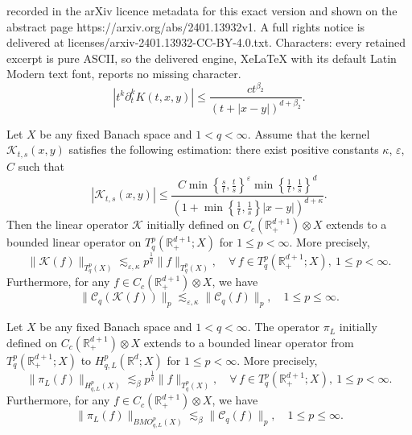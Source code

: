 \documentclass[10pt,a4paper]{amsart}
\newcommand\jdz[1]{ \left| #1 \right| }
\newcommand\lk[1]{ \left\{ #1 \right\} }
\newcommand\sk[1]{ \left( #1 \right) }
\newcommand{\K}{{\mathcal K}}
\newcommand{\e}{\varepsilon}
\newcommand{\real}{{\mathbb R}}
\begin{document}
recorded in the arXiv licence metadata for this exact version and shown on the abstract page https://arxiv.org/abs/2401.13932v1. A full rights notice is delivered at licenses/arxiv-2401.13932-CC-BY-4.0.txt. Characters: every retained excerpt is pure ASCII, so the delivered engine, XeLaTeX with its default Latin Modern text font, reports no missing character.
    \begin{equation}\label{derpt}
        \jdz{ t^k \partial^k_t K(t, x, y) } \leq \frac{c t^{\beta_2} }{(t + |x - y|)^{d + \beta_2}  }.
    \end{equation}

\begin{lemma}\label{BoundTent}
Let $X$ be any fixed Banach space and $1<q<\infty$. Assume that the kernel $\K_{t, s}(x, y)$ satisfies the following estimation: there exist positive constants $ \kappa $, $ \e$, $C$ such that 
\begin{equation}\label{esKts}
    |\K_{t, s}(x, y)| \leq \frac{ C\min\lk{\frac{s}{t},  \frac{t}{s}}^\e \min\lk{ \frac{1}{t}, \frac{1}{s} }^d }{\sk{ 1 + \min\lk{ \frac{1}{t}, \frac{1}{s} }|x - y| }^{d + \kappa}  }.
\end{equation}
    Then the linear operator $\K$ initially defined on $C_c(\real^{d+1}_+)\otimes X$ extends to a bounded linear operator on $T^p_q(\real^{d+1}_+; X)$ for $1 \leq p < \infty$. More precisely, 
    \[
        \| \K(f) \|_{T^p_q(X)} \lesssim_{\e, \kappa} p^{\frac{1}{q}} \| f \|_{T^p_q(X)}, \quad \forall\, f \in T^p_q(\real^{d+1}_+; X), \ 1 \leq p < \infty.
    \]
    Furthermore, for any $f \in C_c(\real^{d+1}_+)\otimes X$, we have
    \[
        \| \mathcal{C}_q\sk{\K(f)} \|_p \lesssim_{\e, \kappa} \| \mathcal{C}_{q}(f) \|_{p}, \quad 1 \leq p \leq \infty.
    \]
\end{lemma}

\begin{lemma}\label{l3.8}
Let $X$ be any fixed Banach space and $1<q<\infty$. The operator $\pi_L$ initially defined on $C_c(\real^{d+1}_+)\otimes X$ extends to a bounded linear operator from $T^p_q(\real^{d+1}_+; X)$ to $H^p_{q, L}(\real^d; X)$ for $1 \leq p < \infty$. More precisely,
    \[
        \| \pi_L(f) \|_{H^p_{q, L}(X)} \lesssim_{\beta} p^{\frac{1}{q}}\| f \|_{T^p_q(X)}, \quad \forall\, f \in T^p_q(\real^{d+1}_+;X), \ 1 \leq p < \infty.
    \]
    Furthermore, for any $f \in C_c(\real^{d+1}_+)\otimes X$, we have
    \[
        \| \pi_L(f) \|_{BMO^p_{q, L}(X)} \lesssim_{\beta} \| \mathcal{C}_q(f) \|_{p}, \quad 1 \leq p \leq \infty.
    \]
\end{lemma}
\end{document}
